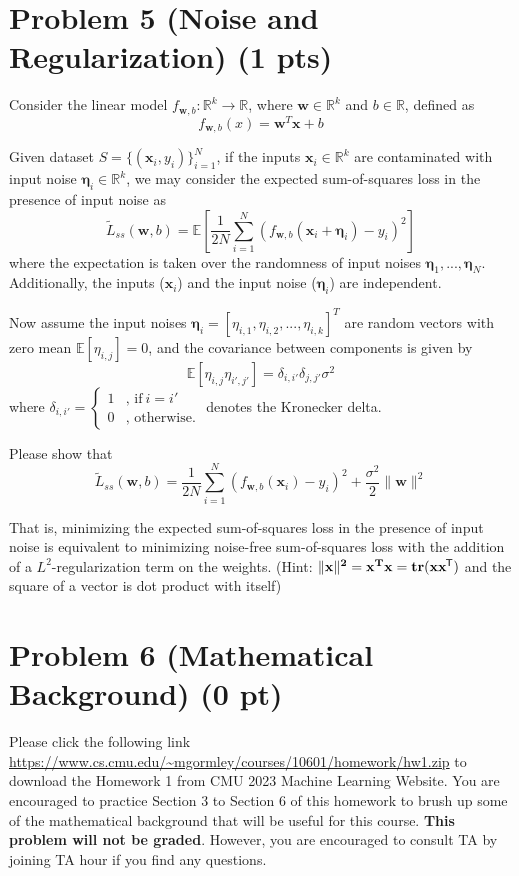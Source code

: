 \documentclass{article}
\newcommand*{\tran}{^{\mkern-1.5mu\mathsf{T}}}
\begin{document}
\section*{Problem 5 (Noise and Regularization) (1 pts)}
Consider the linear model $f_{\mathbf{w},b}: \mathbb{R}^k \rightarrow \mathbb{R}$, where $\mathbf{w} \in \mathbb{R}^k$ and $b \in \mathbb{R}$, defined as
$$f_{\mathbf{w},b}(x) = \mathbf{w}^T \mathbf{x} + b$$

Given dataset $S = \{(\mathbf{x}_i,y_i)\}_{i=1}^N$, if the inputs $\mathbf{x}_i \in \mathbb{R}^k$ are contaminated with input noise $\boldsymbol{\eta}_i \in \mathbb{R}^k$, we may consider the expected sum-of-squares loss in the presence of input noise as 
$${\tilde L}_{ss}(\mathbf{w},b) = \mathbb{E}\left[ \frac{1}{2N}\sum_{i=1}^{N}\left(f_{\mathbf{w},b}(\mathbf{x}_i + \boldsymbol{\eta}_i)-y_i\right)^2 \right]$$
where the expectation is taken over the randomness of input noises $\boldsymbol{\eta}_1,...,\boldsymbol{\eta}_N$. Additionally, the inputs ($\mathbf{x}_i$) and the input noise ($\boldsymbol{\eta}_i$) are independent.

Now assume the input noises $\mathbf{\eta}_i = [\eta_{i,1}, \eta_{i,2}, ... ,\eta_{i,k}]^T$ are random vectors with zero mean $\mathbb{E}[\eta_{i,j}] = 0$, and the covariance between components is given by
$$\mathbb{E}[\eta_{i,j}\eta_{i',j'}] = \delta_{i,i'}\delta_{j,j'} \sigma^2$$
where $\delta_{i,i'} = \left\{\begin{array}{ll} 
1 & \mbox{, if} ~ i = i'\\
0 & \mbox{, otherwise.}
\end{array}\right.$ denotes the Kronecker delta. 

Please show that
$${\tilde L}_{ss}(\mathbf{w},b) = \frac{1}{2N}\sum_{i=1}^{N}\left(f_{\mathbf{w},b}(\mathbf{x}_i)-y_i\right)^2 + \frac{\sigma^2}{2}\|\mathbf{w}\|^2$$

That is, minimizing the expected sum-of-squares loss in the presence of input noise is equivalent to minimizing noise-free sum-of-squares loss with the addition of a $L^2$-regularization term on the weights.
(Hint: $\|\bf{x}\|^2 = {\bf x}^T{\bf x} = tr({\bf x}{\bf x}\tran)$ and the square of a vector is dot product with itself)




\section*{Problem 6 (Mathematical Background) (0 pt)}
Please click the following link \url{https://www.cs.cmu.edu/~mgormley/courses/10601/homework/hw1.zip}
to download the Homework 1 from CMU 2023 Machine Learning Website. You are encouraged to practice Section 3 to Section 6 of this homework to brush up some of the mathematical background that will be useful for this course. \textbf{This problem will not be graded}. However, you are encouraged to consult TA by joining TA hour if you find any questions.
\end{document}
